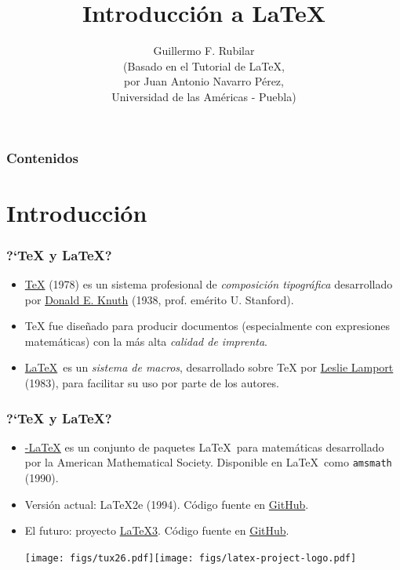 \documentclass[colorlinks,aspectratio=169]{beamer}
\begin{document}
\title[\LaTeX]{Introducción a \LaTeX}
\author[G.R.]{{Guillermo F. Rubilar} \\ \tiny (Basado en el Tutorial de \LaTeX ,\\
por Juan Antonio Navarro Pérez, \\Universidad de las Américas - Puebla)}
\frame{\titlepage}


\begin{frame}
\frametitle{Contenidos}
\tableofcontents
\end{frame}


\section{Introducción}
\begin{frame}[fragile]\frametitle{?`\TeX{} y \LaTeX?}
\begin{itemize}
\item \href{https://es.wikipedia.org/wiki/TeX}{\TeX{}} (1978) es un sistema profesional de \emph{composición tipográfica} desarrollado
por \href{https://es.wikipedia.org/wiki/Donald_Knuth}{Donald E. Knuth} (1938, prof. emérito U. Stanford).
\item \TeX{} fue dise\~nado para producir documentos (especialmente con expresiones matemáticas) con la más alta \emph{calidad de imprenta}.
\item \href{https://es.wikipedia.org/wiki/LaTeX}{\LaTeX}\ es un \emph{sistema de macros}, desarrollado sobre \TeX{} por \href{https://es.wikipedia.org/wiki/Leslie_Lamport}{Leslie Lamport} (1983), para facilitar su uso por parte de los autores.
\end{itemize}
\end{frame}

\begin{frame}[fragile]\frametitle{?`\TeX{} y \LaTeX?}
\begin{itemize}
\item \href{https://es.wikipedia.org/wiki/AMS-LaTeX}{\AmS -\LaTeX} es un conjunto de paquetes \LaTeX\ para matemáticas desarrollado por la American Mathematical Society. Disponible en \LaTeX\ como \texttt{amsmath} 
(1990).
  \item Versión actual: \LaTeX2e (1994). Código fuente en \href{https://github.com/latex3/latex2e}{GitHub}.
  \item El futuro: proyecto \href{https://www.latex-project.org/latex3/}{\LaTeX3}. Código fuente en \href{https://github.com/latex3/latex3}{GitHub}.
	\begin{center}
		\texttt{[image: figs/tux26.pdf]}\texttt{[image: figs/latex-project-logo.pdf]}
	\end{center}
\end{itemize}
\end{frame}
\end{document}
